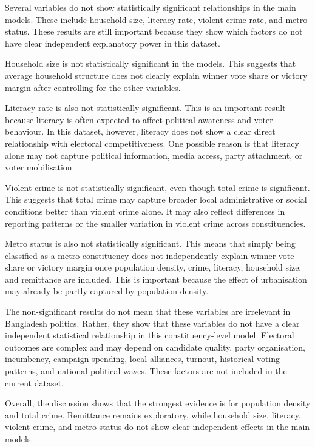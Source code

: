 \documentclass[12pt,a4paper]{article}
\begin{document}
Several variables do not show statistically significant relationships in the main models. These include household size, literacy rate, violent crime rate, and metro status. These results are still important because they show which factors do not have clear independent explanatory power in this dataset.

Household size is not statistically significant in the models. This suggests that average household structure does not clearly explain winner vote share or victory margin after controlling for the other variables.

Literacy rate is also not statistically significant. This is an important result because literacy is often expected to affect political awareness and voter behaviour. In this dataset, however, literacy does not show a clear direct relationship with electoral competitiveness. One possible reason is that literacy alone may not capture political information, media access, party attachment, or voter mobilisation.

Violent crime is not statistically significant, even though total crime is significant. This suggests that total crime may capture broader local administrative or social conditions better than violent crime alone. It may also reflect differences in reporting patterns or the smaller variation in violent crime across constituencies.

Metro status is also not statistically significant. This means that simply being classified as a metro constituency does not independently explain winner vote share or victory margin once population density, crime, literacy, household size, and remittance are included. This is important because the effect of urbanisation may already be partly captured by population density.

The non-significant results do not mean that these variables are irrelevant in Bangladesh politics. Rather, they show that these variables do not have a clear independent statistical relationship in this constituency-level model. Electoral outcomes are complex and may depend on candidate quality, party organisation, incumbency, campaign spending, local alliances, turnout, historical voting patterns, and national political waves. These factors are not included in the current dataset.

Overall, the discussion shows that the strongest evidence is for population density and total crime. Remittance remains exploratory, while household size, literacy, violent crime, and metro status do not show clear independent effects in the main models.
\end{document}
